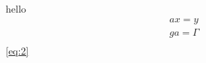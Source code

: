 \documentclass[dvipdfmx]{jsarticle}
\begin{document}
hello
\begin{eqnarray}
ax=y \label{eq:1} \\
ga= \Gamma \label{eq:2} \\
\end{eqnarray}
\ref{eq:2}
\end{document}
